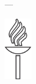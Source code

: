\thispagestyle{empty}
\begin{center}

\vspace*{6.5cm}

\myFirstName \myLastName

\vspace{0.5cm}

\textbf{\Large \MakeTextUppercase{\myTitle}}

---

\large \MakeTextUppercase{\mySubtitle}

\vspace{9cm}

\includegraphics[height=2.7cm]{gfx/jyu-logo.eps}


\normalsize
\MakeTextUppercase{\myUni}\\
\footnotesize
\MakeTextUppercase{\myFaculty}\\
\MakeTextUppercase{\myDepartment}\\
\myTime

\end{center}